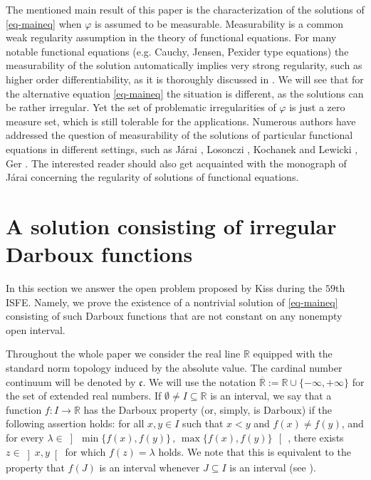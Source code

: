 \documentclass[12pt]{amsart}
\theoremstyle{remark}
\theoremstyle{definition}
\newcommand{\RR}{\mathbb{R}}
\newcommand{\cnc}{\mathfrak{c}}
\newcommand{\RRx}{\overline{\mathbb{R}}}
\newcommand{\map}{\longrightarrow}
\begin{document}
The mentioned main result of this paper is the 
characterization of the solutions of \eqref{eq-maineq} 
when $ \varphi $ is assumed to be measurable. 
Measurability is a common weak regularity assumption 
in the theory of functional equations. 
For many notable functional equations 
(e.g. Cauchy, Jensen, Pexider type equations) the 
measurability of the solution automatically 
implies very strong regularity, such as 
higher order differentiability, as it is 
thoroughly discussed in \cite{Kuc09}. 
We will see that for the alternative 
equation \eqref{eq-maineq} the situation is different, 
as the solutions can be rather irregular. 
Yet the set of problematic irregularities of $ \varphi $ 
is just a zero measure set, which is still tolerable 
for the applications. 
Numerous authors have addressed the question of 
measurability of the solutions of particular 
functional equations in different settings, 
such as Járai \cite{Jar86, Jar10}, 
Losonczi \cite{Los93}, Kochanek and Lewicki \cite{KL11}, 
Ger \cite{Ger18}. 
The interested reader should also get acquainted 
with the monograph \cite{Jar05} of Járai 
concerning the regularity of 
solutions of functional equations. 


\section[Darboux solutions]{A solution consisting of irregular Darboux functions}


In this section 
we answer the open problem 
proposed by Kiss \cite{59ISFE} during the $59$th ISFE. 
Namely, we prove the existence of a 
nontrivial solution of \eqref{eq-maineq} consisting of 
such Darboux functions that are not constant on 
any nonempty open interval. 

Throughout the whole paper we consider 
the real line $ \RR $ equipped with the 
standard norm topology 
induced by the absolute value. 
The cardinal number 
continuum will be denoted by $ \cnc $. 
We will use the notation 
$ \RRx := \RR \cup \lbrace -\infty, +\infty \rbrace $ 
for the set of extended real numbers. 
If $ \emptyset \neq I \subseteq \RR $ is an interval, 
we say that a function 
$ f : I \map \RR $ has the 
Darboux property (or, simply, is Darboux) if 
the following assertion holds: 
for all $ x,y \in I $ such that 
$ x < y $ and $ f(x) \neq f(y) $, 
and for every 
$ \lambda \in 
\left] \, \min \lbrace f(x) , f(y) \rbrace \, , \, 
\max \lbrace f(x) , f(y) \rbrace \, \right[ \,$, 
there exists 
$ z \in \left] x , y \right[ $ for which 
$ f(z) = \lambda $ holds. 
We note that this is equivalent to 
the property that $ f(J) $ is an 
interval whenever $ J \subseteq I $ is an interval 
(see \cite[Theorem 9.2]{vRS82}). 
\end{document}
